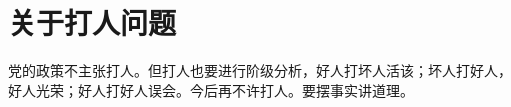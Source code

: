 \section[关于打人问题（一九六六年八月一日）]{关于打人问题}


党的政策不主张打人。但打人也要进行阶级分析，好人打坏人活该；坏人打好人，好人光荣；好人打好人误会。今后再不许打人。要摆事实讲道理。


